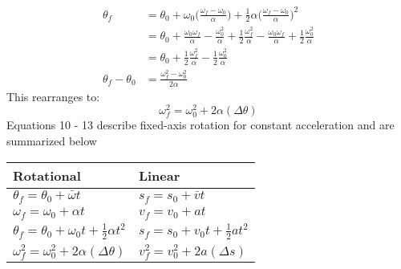 \documentclass[a4paper]{article}
\begin{document}
\begin{align*}
    \theta_f &= \theta_0 + \omega_0 \bigg(\frac{\omega_f - \omega_0}{\alpha}\bigg) + \frac{1}{2}\alpha \bigg(\frac{\omega_f - \omega_0}{\alpha}\bigg)^2\\
    &= \theta_0 + \frac{\omega_0\omega_f}{\alpha} - \frac{\omega_0^2}{\alpha} + \frac{1}{2}\frac{\omega_f^2}{\alpha} - \frac{\omega_0\omega_f}{\alpha} + \frac{1}{2}\frac{\omega_0^2}{\alpha}\\
    &= \theta_0 + \frac{1}{2}\frac{\omega_f^2}{\alpha} - \frac{1}{2}\frac{\omega_0^2}{\alpha}\\
    \theta_f - \theta_0 &= \frac{\omega_f^2 - \omega_0^2}{2\alpha}
\end{align*}
This rearranges to:
\begin{equation}
    \omega_f^2 = \omega_0^2 + 2\alpha(\Delta\theta)
\end{equation}
Equations 10 - 13 describe fixed-axis rotation for constant acceleration and are summarized below
\begin{center}
    \begin{tabularx}{0.4\textwidth}{ 
        | >{\raggedright\arraybackslash}X  
        | >{\raggedright\arraybackslash}X |}
        \hline
        Rotational & Linear\\[2.5pt]
        \hline
        $\theta_f = \theta_0 + \bar{\omega}t$ & $s_f = s_0 + \bar{v}t$\\[2.5pt]
        \hline
        $\omega_f = \omega_0 + \alpha t$ & $v_f = v_0 + at$\\[2.5pt]
        \hline
        $\theta_f = \theta_0 + \omega_0t + \frac{1}{2}\alpha t^2$ & $s_f = s_0 + v_0t + \frac{1}{2}at^2$\\[2.5pt]
        \hline
        $\omega_f^2 = \omega_0^2 + 2\alpha(\Delta\theta)$ & $v_f^2 = v_0^2 + 2a(\Delta s)$\\[2.5pt]
        \hline
    \end{tabularx}
\end{center}
\end{document}
